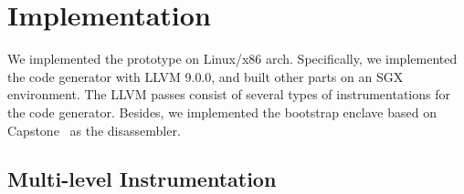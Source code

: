 \section{Implementation}\label{sec-implementation}

We implemented the prototype on Linux/x86 arch. Specifically, we implemented the code generator with LLVM 9.0.0, and built other parts on an SGX environment.
The LLVM passes consist of several types of instrumentations for the code generator. 
Besides, we implemented the bootstrap enclave based on Capstone~\cite{capstone} as the disassembler. 



\subsection{Multi-level Instrumentation}\label{subsec-instrument}





